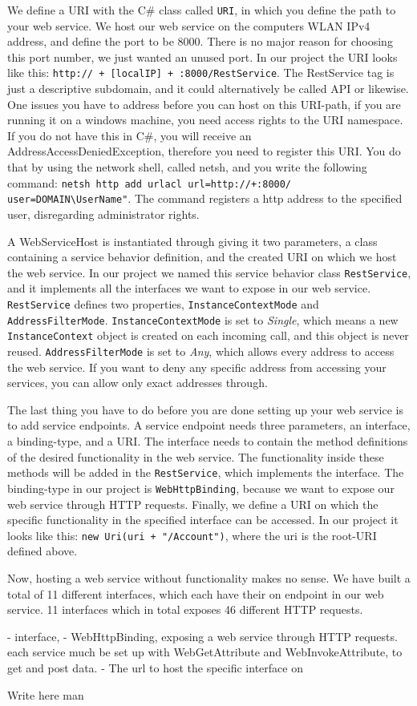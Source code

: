 We define a URI with the C\# class called \texttt{URI}, in which you define the path to your web service. We host our web service on the computers WLAN IPv4 address, and define the port to be 8000. There is no major reason for choosing this port number, we just wanted an unused port. In our project the URI looks like this: \texttt{http:// + [localIP] + :8000/RestService}. The RestService tag is just a descriptive subdomain, and it could alternatively be called API or likewise. One issues you have to address before you can host on this URI-path, if you are running it on a windows machine, you need access rights to the URI namespace. If you do not have this in C\#, you will receive an AddressAccessDeniedException, therefore you need to register this URI. You do that by using the network shell, called netsh, and you write the following command: \texttt{netsh http add urlacl url=http://+:8000/ user=DOMAIN\textbackslash UserName"}. The command registers a http address to the specified user, disregarding administrator rights\cite{netshuri}.

A WebServiceHost is instantiated through giving it two parameters, a class containing a service behavior definition, and the created URI on which we host the web service. In our project we named this service behavior class \texttt{RestService}, and it implements all the interfaces we want to expose in our web service. \texttt{RestService} defines two properties, \texttt{InstanceContextMode} and \texttt{AddressFilterMode}. \texttt{InstanceContextMode} is set to \textit{Single}, which means a new \texttt{InstanceContext} object is created on each incoming call, and this object is never reused. \texttt{AddressFilterMode} is set to \textit{Any}, which allows every address to access the web service. If you want to deny any specific address from accessing your services, you can allow only exact addresses through. 

The last thing you have to do before you are done setting up your web service is to add service endpoints. A service endpoint needs three parameters, an interface, a binding-type, and a URI. The interface needs to contain the method definitions of the desired functionality in the web service. The functionality inside these methods will be added in the \texttt{RestService}, which implements the interface. The binding-type in our project is \texttt{WebHttpBinding}, because we want to expose our web service through HTTP requests. Finally, we define a URI on which the specific functionality in the specified interface can be accessed. In our project it looks like this: \texttt{new Uri(uri + "/Account")}, where the uri is the root-URI defined above.

Now, hosting a web service without functionality makes no sense. We have built a total of 11 different interfaces, which each have their on endpoint in our web service. 11 interfaces which in total exposes 46 different HTTP requests. 



- interface, 
- WebHttpBinding, exposing a web service through HTTP requests. each service much be set up with WebGetAttribute and WebInvokeAttribute, to get and post data.
- The url to host the specific interface on

Write here man
